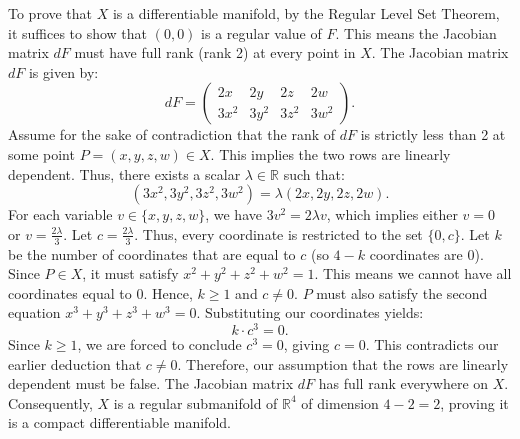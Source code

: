 \documentclass[10pt,a4paper]{article}
\begin{document}
\begin{enumerate}[label=\fbox{\arabic*}]
        To prove that $X$ is a differentiable manifold, by the Regular Level Set Theorem, it suffices to show that $(0, 0)$ is a regular value of $F$. This means the Jacobian matrix $dF$ must have full rank (rank 2) at every point in $X$.
        The Jacobian matrix $dF$ is given by:
        \[
          dF = \begin{pmatrix} 2x & 2y & 2z & 2w \\ 3x^2 & 3y^2 & 3z^2 & 3w^2 \end{pmatrix}.
        \]
        Assume for the sake of contradiction that the rank of $dF$ is strictly less than 2 at some point $P = (x, y, z, w) \in X$. This implies the two rows are linearly dependent. Thus, there exists a scalar $\lambda \in \mathbb{R}$ such that:
        \[
          (3x^2, 3y^2, 3z^2, 3w^2) = \lambda (2x, 2y, 2z, 2w).
        \]
        For each variable $v \in \{x, y, z, w\}$, we have $3v^2 = 2\lambda v$, which implies either $v = 0$ or $v = \frac{2\lambda}{3}$. Let $c = \frac{2\lambda}{3}$. Thus, every coordinate is restricted to the set $\{0, c\}$.
        Let $k$ be the number of coordinates that are equal to $c$ (so $4 - k$ coordinates are $0$).
        Since $P \in X$, it must satisfy $x^2 + y^2 + z^2 + w^2 = 1$. This means we cannot have all coordinates equal to $0$. Hence, $k \ge 1$ and $c \neq 0$.
        $P$ must also satisfy the second equation $x^3 + y^3 + z^3 + w^3 = 0$. Substituting our coordinates yields:
        \[
          k \cdot c^3 = 0.
        \]
        Since $k \ge 1$, we are forced to conclude $c^3 = 0$, giving $c = 0$. This contradicts our earlier deduction that $c \neq 0$.
        Therefore, our assumption that the rows are linearly dependent must be false. The Jacobian matrix $dF$ has full rank everywhere on $X$.
        Consequently, $X$ is a regular submanifold of $\mathbb{R}^4$ of dimension $4 - 2 = 2$, proving it is a compact differentiable manifold.
\end{enumerate}
\end{document}
